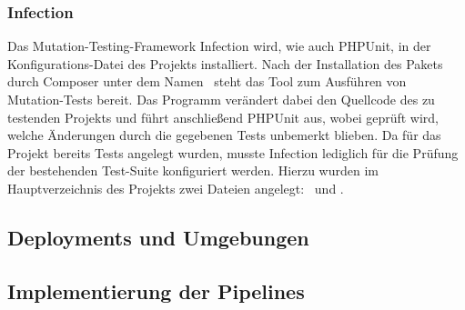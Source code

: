 \subsubsection{Infection}

Das Mutation-Testing-Framework Infection wird, wie auch PHPUnit, in der Konfigurations-Datei
 des Projekts installiert.
Nach der Installation des Pakets durch Composer unter dem Namen\  steht das Tool zum
Ausführen von Mutation-Tests bereit.
Das Programm verändert dabei den Quellcode des zu testenden Projekts und führt anschließend PHPUnit aus, wobei
geprüft wird, welche Änderungen durch die gegebenen Tests unbemerkt blieben.
Da für das Projekt bereits Tests angelegt wurden, musste Infection lediglich für die Prüfung der bestehenden
Test-Suite konfiguriert werden.
Hierzu wurden im Hauptverzeichnis des Projekts zwei Dateien angelegt:\  und
.


\subsection{Deployments und Umgebungen} \label{subsec:04-implementation-3}


\subsection{Implementierung der Pipelines} \label{subsec:04-implementation-4}


\clearpage
